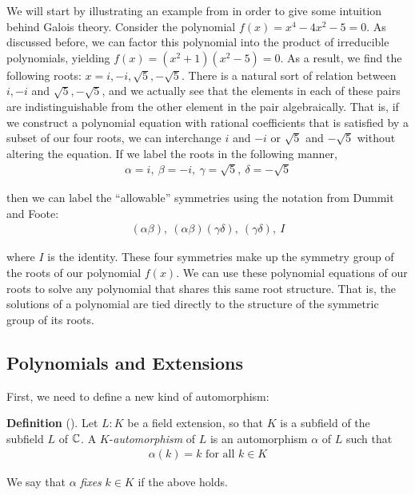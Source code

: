 \documentclass[11pt, a4paper, oneside]{article}
\theoremstyle{plain}
\theoremstyle{plain}
\theoremstyle{plain}
\theoremstyle{plain}
\theoremstyle{definition}
\theoremstyle{example}
\begin{document}
{We will start by illustrating an example from \cite[\S 8.2]{stewart} in order to give some intuition behind Galois theory. Consider the polynomial $f(x) = x^4 - 4x^2 - 5 = 0$. As discussed before, we can factor this polynomial into the product of irreducible polynomials, yielding $f(x) = (x^2+1)(x^2-5) = 0$. As a result, we find the following roots: $x = i, -i, \sqrt{5}, -\sqrt{5}$. There is a natural sort of relation between $i, -i$ and $\sqrt{5}, -\sqrt{5}$, and we actually see that the elements in each of these pairs are indistinguishable from the other element in the pair algebraically. That is, if we construct a polynomial equation with rational coefficients that is satisfied by a subset of our four roots, we can interchange $i$ and $-i$ or $\sqrt{5}$ and $-\sqrt{5}$ without altering the equation. If we label the roots in the following manner,
\begin{align*}
\alpha = i, \ \beta = -i, \ \gamma = \sqrt{5}, \ \delta = -\sqrt{5}
\end{align*}

then we can label the ``allowable'' symmetries using the notation from Dummit and Foote:
\begin{align*}
(\alpha \beta), \ (\alpha \beta)(\gamma \delta), \ (\gamma \delta), \ I
\end{align*}

where $I$ is the identity. These four symmetries make up the symmetry group of the roots of our polynomial $f(x)$. We can use these polynomial equations of our roots to solve any polynomial that shares this same root structure. That is, the solutions of a polynomial are tied directly to the structure of the symmetric group of its roots.

\subsection{Polynomials and Extensions}

First, we need to define a new kind of automorphism:

\textbf{Definition} (\cite[Definition 8.1]{stewart}). Let $L : K$ be a field extension, so that $K$ is a subfield of the subfield $L$ of $\mathbb{C}$. A $K$-\textit{automorphism} of $L$ is an automorphism $\alpha$ of $L$ such that
\begin{align*}
\alpha(k) = k \text{    for all } k \in K
\end{align*}

We say that $\alpha$ \textit{fixes} $k \in K$ if the above holds.

}
\end{document}
